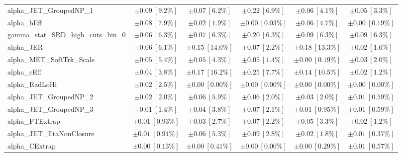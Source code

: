 \begin{sidewaystable}
\begin{center}
\begin{tabular*}{\textwidth}{@{\extracolsep{\fill}}lccccc}
alpha\_JET\_GroupedNP\_1         & $\pm 0.09\ [9.2\%] $          & $\pm 0.07\ [6.2\%] $          & $\pm 0.22\ [6.9\%] $          & $\pm 0.06\ [4.1\%] $          & $\pm 0.05\ [3.3\%] $       \\
alpha\_bEff         & $\pm 0.08\ [7.9\%] $          & $\pm 0.02\ [1.9\%] $          & $\pm 0.00\ [0.03\%] $          & $\pm 0.06\ [4.7\%] $          & $\pm 0.00\ [0.19\%] $       \\
gamma\_stat\_SRD\_high\_cuts\_bin\_0         & $\pm 0.06\ [6.3\%] $          & $\pm 0.07\ [6.3\%] $          & $\pm 0.20\ [6.3\%] $          & $\pm 0.09\ [6.3\%] $          & $\pm 0.09\ [6.3\%] $       \\
alpha\_JER         & $\pm 0.06\ [6.1\%] $          & $\pm 0.15\ [14.0\%] $          & $\pm 0.07\ [2.2\%] $          & $\pm 0.18\ [13.3\%] $          & $\pm 0.02\ [1.6\%] $       \\
alpha\_MET\_SoftTrk\_Scale         & $\pm 0.05\ [5.4\%] $          & $\pm 0.05\ [4.3\%] $          & $\pm 0.05\ [1.4\%] $          & $\pm 0.00\ [0.19\%] $          & $\pm 0.03\ [2.0\%] $       \\
alpha\_cEff         & $\pm 0.04\ [3.8\%] $          & $\pm 0.17\ [16.2\%] $          & $\pm 0.25\ [7.7\%] $          & $\pm 0.14\ [10.5\%] $          & $\pm 0.02\ [1.2\%] $       \\
alpha\_RadLoHi         & $\pm 0.02\ [2.5\%] $          & $\pm 0.00\ [0.00\%] $          & $\pm 0.00\ [0.00\%] $          & $\pm 0.00\ [0.00\%] $          & $\pm 0.00\ [0.00\%] $       \\
alpha\_JET\_GroupedNP\_2         & $\pm 0.02\ [2.0\%] $          & $\pm 0.06\ [5.9\%] $          & $\pm 0.06\ [2.0\%] $          & $\pm 0.03\ [2.0\%] $          & $\pm 0.01\ [0.59\%] $       \\
alpha\_JET\_GroupedNP\_3         & $\pm 0.01\ [1.4\%] $          & $\pm 0.04\ [3.8\%] $          & $\pm 0.07\ [2.1\%] $          & $\pm 0.01\ [0.95\%] $          & $\pm 0.01\ [0.59\%] $       \\
alpha\_FTExtrap         & $\pm 0.01\ [0.93\%] $          & $\pm 0.03\ [2.7\%] $          & $\pm 0.07\ [2.2\%] $          & $\pm 0.05\ [3.3\%] $          & $\pm 0.02\ [1.2\%] $       \\
alpha\_JET\_EtaNonClosure         & $\pm 0.01\ [0.91\%] $          & $\pm 0.06\ [5.3\%] $          & $\pm 0.09\ [2.8\%] $          & $\pm 0.02\ [1.8\%] $          & $\pm 0.01\ [0.37\%] $       \\
alpha\_CExtrap         & $\pm 0.00\ [0.13\%] $          & $\pm 0.00\ [0.41\%] $          & $\pm 0.00\ [0.00\%] $          & $\pm 0.00\ [0.29\%] $          & $\pm 0.01\ [0.57\%] $       \\

\end{tabular*}
\end{center}
\end{sidewaystable}
